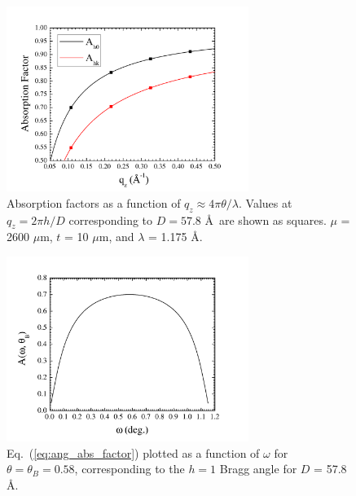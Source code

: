 \begin{figure}[htbp]
  \centering
  \includegraphics[width=0.7\textwidth]{figures/ripple/analysis/abs_factor}
  \caption{Absorption factors as a function of $q_z \approx 4\pi\theta/\lambda$.
  Values at $q_z=2\pi h/D$ corresponding to $D=57.8$ \AA\ are shown as squares.
  $\mu$ = 2600 $\mu$m, $t$ = 10 $\mu$m, and $\lambda$ = 1.175 \AA.}
  \label{fig:abs_factor}
\end{figure}

\begin{figure}[htbp]
  \centering
  \includegraphics[width=0.7\textwidth]{figures/ripple/analysis/abs_integrand}
  \caption[Eq.~(\ref{eq:ang_abs_factor}) plotted as a function of $\omega$ for 
  $\theta=\theta_B$]{Eq.~(\ref{eq:ang_abs_factor}) plotted as a function of 
  $\omega$ for $\theta=\theta_B=0.58$\textdegree, corresponding to the $h=1$ 
  Bragg
  angle for $D$ = 57.8 \AA.}
  \label{fig:abs_integrand}
\end{figure}

